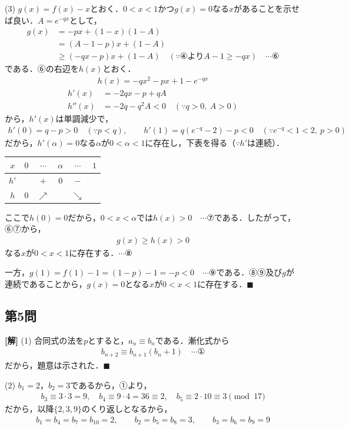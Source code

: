 \documentclass[../main.tex]{subfiles}
\begin{document}
(3) $g(x)=f(x)-x$とおく．$0<x<1$かつ$g(x)=0$なる$x$があることを示せば良い．$A=e^{-qx}$として，
\begin{align*}
  g(x)&=-px+(1-x)(1-A)\\
  &=(A-1-p)x+(1-A)\\
  &\ge(-qx-p)x+(1-A)\quad(\because④\text{より}A-1\ge-qx)\quad\cdots⑥
\end{align*}
である．⑥の右辺を$h(x)$とおく．
\begin{align*}
  h(x)=-qx^2-px+1-e^{-qx}
\end{align*}
\begin{align*}
  h'(x)&=-2qx-p+qA\\
  h''(x)&=-2q-q^2A<0\quad(\because q>0,\ A>0)
\end{align*}
から，$h'(x)$は単調減少で，
\begin{align*}
  h'(0)=q-p>0\quad(\because p<q),\qquad h'(1)=q(e^{-q}-2)-p<0\quad(\because e^{-q}<1<2,\ p>0)
\end{align*}
だから，$h'(\alpha)=0$なる$\alpha$が$0<\alpha<1$に存在し，下表を得る（$\because h'$は連続）．
\begin{center}
  \begin{tabular}{c|ccccc}
    $x$ & $0$ & $\cdots$ & $\alpha$ & $\cdots$ & $1$ \\
    \hline
    $h'$ & & $+$ & $0$ & $-$ & \\
    $h$ & $0$ & $\nearrow$ & & $\searrow$ & \\
  \end{tabular}
\end{center}
ここで$h(0)=0$だから，$0<x<\alpha$では$h(x)>0\quad\cdots⑦$である．したがって，⑥⑦から，
\begin{align*}
  g(x)\ge h(x)>0
\end{align*}
なる$x$が$0<x<1$に存在する．$\cdots⑧$

一方，$g(1)=f(1)-1=(1-p)-1=-p<0\quad\cdots⑨$である．⑧⑨及び$g$が連続であることから，$g(x)=0$となる$x$が$0<x<1$に存在する．$\blacksquare$

\subsection*{第5問}

{\bf [解]}
(1) 合同式の法を$p$とすると，$a_n\equiv b_n$である．漸化式から
\begin{align*}
  b_{n+2}\equiv b_{n+1}(b_n+1)\quad\cdots①
\end{align*}
だから，題意は示された．$\blacksquare$

(2) $b_1=2$，$b_2=3$であるから，①より，
\begin{align*}
  b_3\equiv3\cdot3=9,\quad b_4\equiv9\cdot4=36\equiv2,\quad b_5\equiv2\cdot10\equiv3\pmod{17}
\end{align*}
だから，以降$\{2,3,9\}$のくり返しとなるから，
\begin{align*}
  b_1=b_4=b_7=b_{10}=2,\qquad b_2=b_5=b_8=3,\qquad b_3=b_6=b_9=9
\end{align*}
\end{document}
